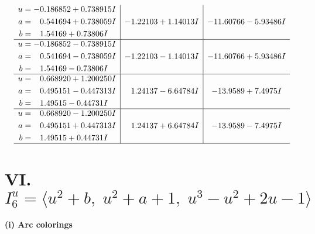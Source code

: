 \documentclass[1p]{elsarticle_modified}
\theoremstyle{definition}
\begin{document}
$$\begin{array}{c|c|c}
\begin{aligned}
u &= -0.186852 + 0.738915 I \\
a &= \phantom{-}0.541694 + 0.738059 I \\
b &= \phantom{-}1.54169 + 0.73806 I\end{aligned}
 & -1.22103 + 1.14013 I & -11.60766 - 5.93486 I \\ \hline\begin{aligned}
u &= -0.186852 - 0.738915 I \\
a &= \phantom{-}0.541694 - 0.738059 I \\
b &= \phantom{-}1.54169 - 0.73806 I\end{aligned}
 & -1.22103 - 1.14013 I & -11.60766 + 5.93486 I \\ \hline\begin{aligned}
u &= \phantom{-}0.668920 + 1.200250 I \\
a &= \phantom{-}0.495151 - 0.447313 I \\
b &= \phantom{-}1.49515 - 0.44731 I\end{aligned}
 & \phantom{-}1.24137 - 6.64784 I & -13.9589 + 7.4975 I \\ \hline\begin{aligned}
u &= \phantom{-}0.668920 - 1.200250 I \\
a &= \phantom{-}0.495151 + 0.447313 I \\
b &= \phantom{-}1.49515 + 0.44731 I\end{aligned}
 & \phantom{-}1.24137 + 6.64784 I & -13.9589 - 7.4975 I\\
 \hline 
 \end{array}$$\newpage\newpage\renewcommand{\arraystretch}{1}
\centering \section*{VI. $I^u_{6}= \langle u^2+b,\;u^2+a+1,\;u^3- u^2+2 u-1 \rangle$}
\flushleft \textbf{(i) Arc colorings}\\
\end{document}
